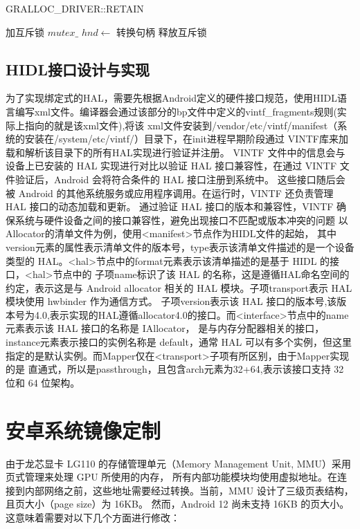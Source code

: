\begin{algorithm}
\caption{GRALLOC\_DRIVER::RETAIN}
\label{algo:RETAIN}
\SetAlgoLined
{}
\BlankLine
加互斥锁 $mutex\_$\;
$hnd \leftarrow$ 转换句柄\;
释放互斥锁\;
\end{algorithm}

\subsection{HIDL接口设计与实现}
为了实现绑定式的HAL，需要先根据Android定义的硬件接口规范，使用HIDL语言编写xml文件。编译器会通过该部分的bp文件中定义的vintf\_fragments规则(实际上指向的就是该xml文件),将该
xml文件安装到/vendor/etc/vintf/manifest（系统的安装在/system/etc/vintf/）目录下，在init进程早期阶段通过 VINTF库来加载和解析该目录下的所有HAL实现进行验证并注册。
VINTF 文件中的信息会与设备上已安装的 HAL 实现进行对比以验证 HAL 接口兼容性，在通过 VINTF 文件验证后，Android 会将符合条件的 HAL 接口注册到系统中。
这些接口随后会被 Android 的其他系统服务或应用程序调用。在运行时，VINTF 还负责管理 HAL 接口的动态加载和更新。
通过验证 HAL 接口的版本和兼容性，VINTF 确保系统与硬件设备之间的接口兼容性，避免出现接口不匹配或版本冲突的问题
以Allocator的清单文件为例，使用<manifest>节点作为HIDL文件的起始，
其中version元素的属性表示清单文件的版本号，type表示该清单文件描述的是一个设备类型的 HAL。<hal>节点中的format元素表示该清单描述的是基于 HIDL 的接口，<hal>节点中的
子项name标识了该 HAL 的名称，这是遵循HAL命名空间的约定，表示这是与 Android allocator 相关的 HAL 模块。子项transport表示 HAL 模块使用 hwbinder 作为通信方式。
子项version表示该 HAL 接口的版本号,该版本号为4.0,表示实现的HAL遵循allocator4.0的接口。而<interface>节点中的name元素表示该 HAL 接口的名称是 IAllocator，
是与内存分配器相关的接口，instance元素表示接口的实例名称是 default，通常 HAL 可以有多个实例，但这里指定的是默认实例。而Mapper仅在<transport>子项有所区别，由于Mapper实现的是
直通式，所以是passthrough，且包含arch元素为32+64,表示该接口支持 32 位和 64 位架构。

\section{安卓系统镜像定制}
由于龙芯显卡 LG110 的存储管理单元（Memory Management Unit, MMU）采用页式管理来处理 GPU 所使用的内存，
所有内部功能模块均使用虚拟地址。在连接到内部网络之前，这些地址需要经过转换。当前，MMU 设计了三级页表结构，且页大小（page size）为 16KB。
然而，Android 12 尚未支持 16KB 的页大小。这意味着需要对以下几个方面进行修改：

